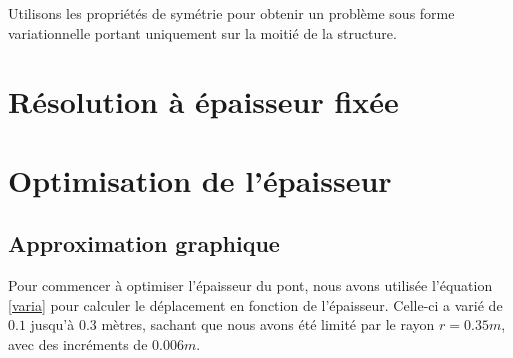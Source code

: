 \documentclass{article}
\begin{document}
    \begin{solution}   
        
    \end{solution}

    \begin{problem}{2}
    Utilisons les propriétés de symétrie pour obtenir un problème sous forme variationnelle portant uniquement sur la moitié de la structure.
    \end{problem}
    
    \begin{solution}   
        
    \end{solution}

    \section{Résolution à épaisseur fixée}
        
    \section{Optimisation de l'épaisseur}

    \subsection{Approximation graphique}
    
    Pour commencer à optimiser l'épaisseur du pont, nous avons utilisée l'équation \ref{varia} pour calculer le déplacement en fonction de l'épaisseur. Celle-ci a varié de $0.1$ jusqu'à $0.3$ mètres, sachant que nous avons été limité par le rayon $r = 0.35 m$, avec des incréments de $0.006 m$.
    
\end{document}
